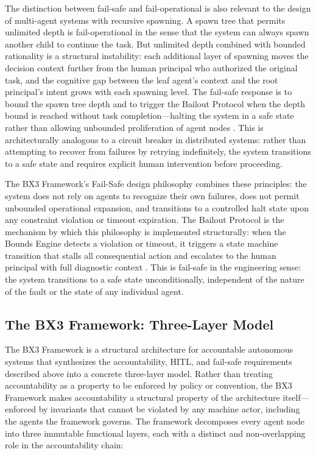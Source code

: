 The distinction between fail-safe and fail-operational is also relevant to the design of multi-agent systems with recursive spawning. A spawn tree that permits unlimited depth is fail-operational in the sense that the system can always spawn another child to continue the task. But unlimited depth combined with bounded rationality is a structural instability: each additional layer of spawning moves the decision context further from the human principal who authorized the original task, and the cognitive gap between the leaf agent's context and the root principal's intent grows with each spawning level. The fail-safe response is to bound the spawn tree depth and to trigger the Bailout Protocol when the depth bound is reached without task completion---halting the system in a safe state rather than allowing unbounded proliferation of agent nodes \cite{bx3framework2026}. This is architecturally analogous to a circuit breaker in distributed systems: rather than attempting to recover from failures by retrying indefinitely, the system transitions to a safe state and requires explicit human intervention before proceeding.

The BX3 Framework's Fail-Safe design philosophy combines these principles: the system does not rely on agents to recognize their own failures, does not permit unbounded operational expansion, and transitions to a controlled halt state upon any constraint violation or timeout expiration. The Bailout Protocol is the mechanism by which this philosophy is implemented structurally: when the Bounds Engine detects a violation or timeout, it triggers a state machine transition that stalls all consequential action and escalates to the human principal with full diagnostic context \cite{bailoutprotocol2026}. This is fail-safe in the engineering sense: the system transitions to a safe state unconditionally, independent of the nature of the fault or the state of any individual agent.


\subsection{The BX3 Framework: Three-Layer Model}

The BX3 Framework is a structural architecture for accountable autonomous systems that synthesizes the accountability, HITL, and fail-safe requirements described above into a concrete three-layer model. Rather than treating accountability as a property to be enforced by policy or convention, the BX3 Framework makes accountability a structural property of the architecture itself---enforced by invariants that cannot be violated by any machine actor, including the agents the framework governs. The framework decomposes every agent node into three immutable functional layers, each with a distinct and non-overlapping role in the accountability chain:

